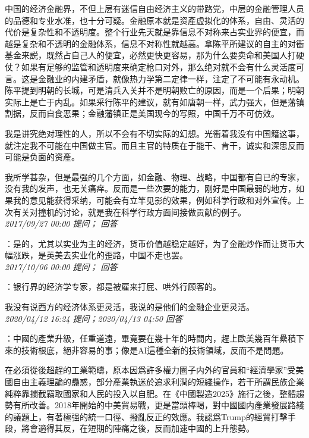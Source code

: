 \documentclass[twocolumn]{ctexart}
\begin{document}
中国的经济金融界，不但上层有迷信自由经济主义的带路党，中层的金融管理人员的品德和专业水准，也十分可疑。金融原本就是资產虚拟化的体系，自由、灵活的代价是复杂性和不透明度。整个行业先天就是靠信息不对称来占实业界的便宜，而越是复杂和不透明的金融体系，信息不对称性就越高。拿陈平所建议的自主的对衝基金来説，既然占自己人的便宜，必然更快更容易，那为什么要卖命和美国人打硬仗？如果有足够的监管和透明度来确定枪口对外，那么绝对就不会有什么灵活度可言。这是金融业的内建矛盾，就像热力学第二定律一样，注定了不可能有永动机。陈平提到明朝的长城，可是清兵入关并不是明朝败亡的原因，而是一个后果；明朝实际上是亡于内乱。如果采行陈平的建议，就有如唐朝一样，武力强大，但是藩镇割据，反而自食恶果；金融藩镇正是美国现今的写照，中国千万不可仿效。

我是讲究绝对理性的人，所以不会有不切实际的幻想。光衝着我没有中国籍这事，就注定我不可能在中国做主官。而且主官的特质在于能干、肯干，诚实和深思反而可能是负面的资產。

我所学甚杂，但是最强的几个方面，如金融、物理、战略，中国都有自已的专家，没有我的发声，也无关痛痒。反而是一些次要的能力，刚好是中国最弱的地方，如果我的意见能获得采纳，可能会有立竿见影的效果，例如科学行政和对外宣传。上次有关对撞机的讨论，就是我在科学行政方面间接做贡献的例子。\\

\textit{\hfill\noindent\small 2017/09/27 00:00 提问； 回答}

：是的，尤其以实业为主的经济，货币价值越稳定越好，为了金融炒作而让货币大幅涨跌，是英美去实业化的歪路，中国不走也罢。\\

\textit{\hfill\noindent\small 2017/10/06 00:00 提问； 回答}

：银行界的经济学专家，都是被雇来打屁、哄外行顾客的。

我没有说西方的经济体系更灵活，我说的是他们的金融企业更灵活。\\

\textit{\hfill\noindent\small 2020/04/12 16:24 提问；2020/04/13 04:50 回答}

：中國的產業升級，任重道遠，畢竟要在幾十年的時間内，趕上歐美幾百年纍積下來的技術根底，絕非容易的事；像是AI這種全新的技術領域，反而不是問題。

在必須從後超趕的工業範疇，原本因爲許多權力圈子内外的官員和“經濟學家”受美國自由主義理論的蠱惑，部分產業執迷於追求利潤的短綫操作，若干所謂民族企業純粹靠攔截竊取國家和人民的投入以自肥。在《中國製造2025》施行之後，整體趨勢有所改善。2018年開始的中美貿易戰，更是當頭棒喝，對中國國内產業發展路綫的議題上，有著極强的統一口徑、撥亂反正的效應。我認爲Trump的經貿打擊手段，將會適得其反，在短期的陣痛之後，反而加速中國的上升態勢。
\end{document}
